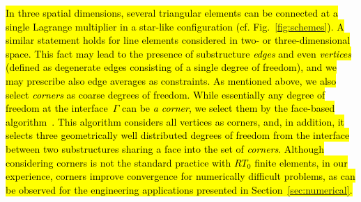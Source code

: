\begin{remark}
\label{rem:constraints}
\hl{In three spatial dimensions, 
several triangular elements can be connected at a single Lagrange multiplier 
in a star-like configuration (cf. Fig.~\ref{fig:schemes}).
A similar statement holds for line elements considered in two- or three-dimensional space.
This fact may lead to the presence of substructure \emph{edges} and even \emph{vertices} 
(defined as degenerate edges consisting of a single degree of freedom),
and we may prescribe also edge averages as constraints. 
As mentioned above, we
also select \emph{corners} as coarse degrees of freedom. While essentially any degree
of freedom at the interface~$\Gamma$ can be \emph{a corner}, we select them by the
face-based algorithm~\cite{Sistek-2012-FSC}. 
This algorithm considers all vertices as corners, and, in addition, 
it selects three geometrically well distributed degrees of freedom 
from the interface between two substructures sharing a face into the set of \emph{corners}.
Although considering corners is not the standard
practice with $RT_{0}$ finite elements, in our experience, corners improve convergence
for numerically difficult problems, as can be observed for the engineering applications
presented in Section~\ref{sec:numerical}.}
\end{remark}

